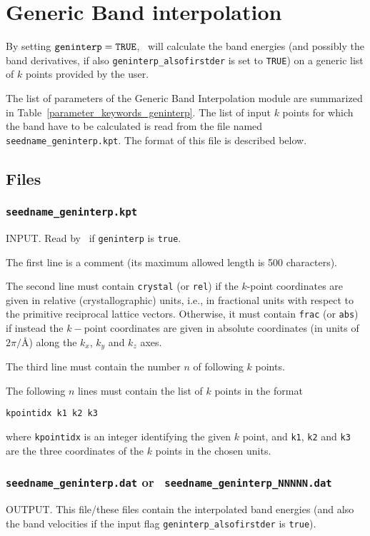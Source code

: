 \chapter{Generic Band interpolation}\label{ch:geninterp}

By setting $\verb#geninterp#=\verb#TRUE#$, \postw\ will calculate the
band energies (and possibly the band derivatives, if also
\verb#geninterp_alsofirstder# is set to \verb#TRUE#) on a generic list
of $k$ points provided by the user.

The list of parameters of the Generic Band Interpolation module are
summarized in Table~\ref{parameter_keywords_geninterp}. 
The list of input $k$ points for which the band have to be calculated
is read from the file named {\tt seedname\_geninterp.kpt}. The format
of this file is
described below. 


\section{Files}
\subsection{{\tt seedname\_geninterp.kpt}}
INPUT. Read by \postw\ if {\tt geninterp} is \verb#true#. 

The first line is a comment (its maximum allowed length is 500
characters).

The second line must contain \verb#crystal# (or \verb#rel#) if the
$k$-point coordinates are given in relative (crystallographic) units,
i.e., in fractional units with respect to the primitive reciprocal
lattice vectors.
Otherwise, it must contain \verb#frac# (or \verb#abs#) if instead the
$k-$point coordinates are given in absolute 
coordinates (in units of $2\pi/$\AA) along the $k_x$, $k_y$ and $k_z$
axes.

The third line must contain the number $n$ of following $k$ points.

The following $n$ lines must contain the list of $k$ points in the
format
\begin{verbatim}
kpointidx k1 k2 k3
\end{verbatim}
where \verb#kpointidx# is an integer identifying the given $k$ point,
and \verb#k1#, \verb#k2# and \verb#k3# are the three coordinates of the
$k$ points in the chosen units.


\subsection{{\tt seedname\_geninterp.dat} or {\tt
    seedname\_geninterp\_NNNNN.dat}}
\label{sec:seedname.geninterp.dat}
OUTPUT. This file/these files contain the interpolated band energies (and also the band
velocities if the input flag \verb#geninterp_alsofirstder# is \verb#true#).

